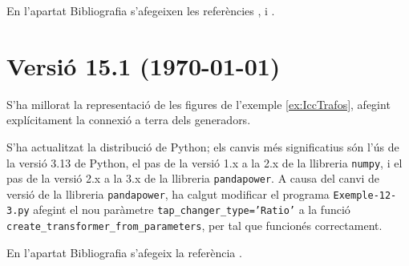 En l'apartat Bibliografia s'afegeixen les referències \cite{KRE}, \cite{SAL}  i \cite{MGIO}.


\section*{Versió 15.1 (\today)}

S'ha millorat la representació de les figures de l'exemple \ref{ex:IccTrafos}, afegint explícitament la connexió a terra dels generadors.

S'ha actualitzat la distribució de Python; els canvis més significatius són l'ús de la versió 3.13 de Python, el pas de la versió 1.x a la 2.x de la llibreria \texttt{numpy}, i el pas de la versió 2.x a la 3.x de la llibreria \texttt{pandapower}. A causa del canvi de versió de la llibreria \texttt{pandapower}, ha calgut modificar el programa \texttt{Exemple-12-3.py} afegint el nou paràmetre \texttt{tap\_changer\_type='Ratio'} a la funció \texttt{create\_transformer\_from\_parameters}, per tal que funcionés correctament.

En l'apartat Bibliografia s'afegeix la referència \cite{SSMH}.



